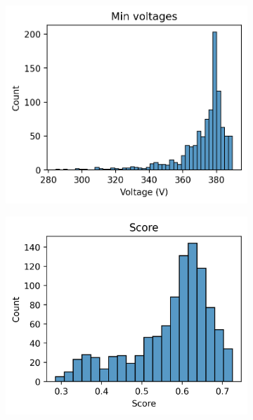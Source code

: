 \begin{figure}[H]
\begin{subfigure}{.33\textwidth}
      \caption{}
      \label{fig:appendix:suburb2:histograms:line_loss_rel}
    \end{subfigure}\\
    \begin{subfigure}{.33\textwidth}
      \centering
      \includegraphics[width=\linewidth]{img/switchstate_exploring/suburb2/histograms/min_voltage.png}
      \caption{}
      \label{fig:appendix:suburb2:histograms:min_voltage}
    \end{subfigure}%
    \begin{subfigure}{.33\textwidth}
      \centering
      \includegraphics[width=\linewidth]{img/switchstate_exploring/suburb2/histograms/score.png}
      \caption{}
      \label{fig:appendix:suburb2:histograms:score}
    \end{subfigure}
    \caption{}
    \label{fig:appendix:suburb2:histograms}
\end{figure}

